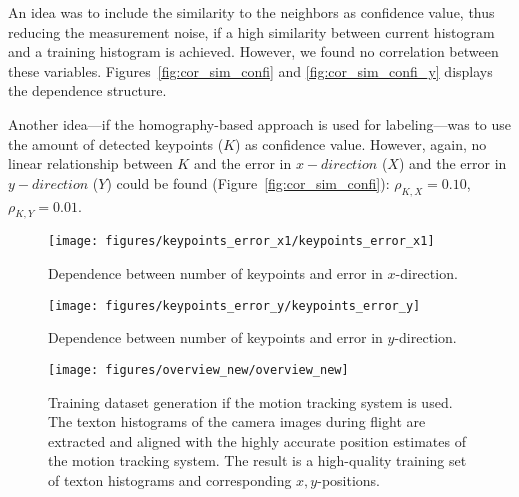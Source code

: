 \documentclass{report}
\begin{document}
An idea was to include the similarity to the neighbors as confidence
value, thus reducing the measurement noise, if a high similarity
between current histogram and a training histogram is
achieved. However, we found no correlation between these
variables. Figures~\ref{fig:cor_sim_confi} and
\ref{fig:cor_sim_confi_y} displays the dependence structure.

Another idea---if the homography-based approach is used for
labeling---was to use the amount of detected keypoints ($K$) as
confidence value. However, again, no linear relationship between $K$
and the error in $x-direction$ ($X$) and the error in $y-direction$
($Y$) could be found (Figure~\ref{fig:cor_sim_confi}):
$\rho_{K, X} = 0.10$, $\rho_{K, Y} = 0.01$.

\begin{figure}[h!]
\begin{center}
\texttt{[image: figures/keypoints\_error\_x1/keypoints\_error\_x1]}
\caption{{Dependence between number of keypoints and error in $x$-direction.%
}}
\end{center}
\end{figure}

\begin{figure}[h!]
\begin{center}
\texttt{[image: figures/keypoints\_error\_y/keypoints\_error\_y]}
\caption{{Dependence between number of keypoints and error in $y$-direction.%
}}
\end{center}
\end{figure}

\begin{figure}[h!]
\begin{center}
\texttt{[image: figures/overview\_new/overview\_new]}
\caption{{Training dataset generation if the motion tracking system is
    used. The texton histograms of the camera images during flight are
    extracted and aligned with the highly accurate position estimates
    of the motion tracking system. The result is a high-quality
    training set of texton histograms and corresponding
    $x,y$-positions.%
  }}
\end{center}
\end{figure}
\end{document}
